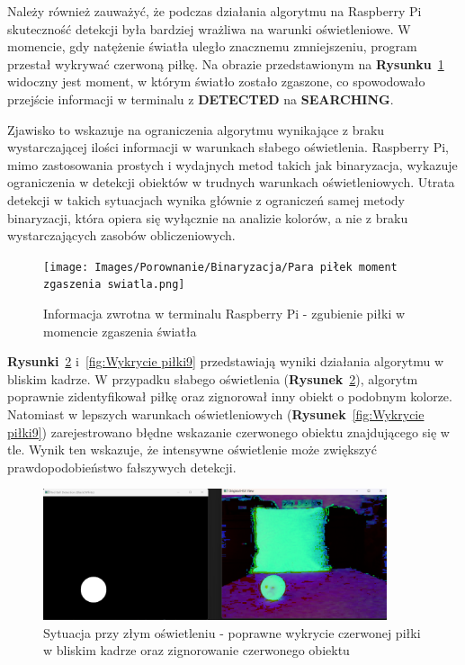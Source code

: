 \documentclass[a4paper,twoside,12pt]{book}
\begin{document}
Należy również zauważyć, że podczas działania algorytmu na Raspberry Pi skuteczność detekcji była bardziej wrażliwa na warunki oświetleniowe. W momencie, gdy natężenie światła uległo znacznemu zmniejszeniu, program przestał wykrywać czerwoną piłkę. Na obrazie przedstawionym na \textbf{Rysunku}~\ref{fig:Wykrycie piłki Rasp} widoczny jest moment, w którym światło zostało zgaszone, co spowodowało przejście informacji w terminalu z \textbf{DETECTED} na \textbf{SEARCHING}.


Zjawisko to wskazuje na ograniczenia algorytmu wynikające z braku wystarczającej ilości informacji w warunkach słabego oświetlenia. Raspberry Pi, mimo zastosowania prostych i wydajnych metod takich jak binaryzacja, wykazuje ograniczenia w detekcji obiektów w trudnych warunkach oświetleniowych. Utrata detekcji w takich sytuacjach wynika głównie z ograniczeń samej metody binaryzacji, która opiera się wyłącznie na analizie kolorów, a nie z braku wystarczających zasobów obliczeniowych.
\begin{figure}[h]
    \centering
    \texttt{[image: Images/Porownanie/Binaryzacja/Para piłek moment zgaszenia swiatla.png]}
    \caption{Informacja zwrotna w  terminalu Raspberry Pi - zgubienie piłki w momencie zgaszenia światła}
    \label{fig:Wykrycie piłki Rasp}
\end{figure}


\newpage

\textbf{Rysunki}~\ref{fig:Wykrycie piłki8} i~\ref{fig:Wykrycie piłki9} przedstawiają wyniki działania algorytmu w bliskim kadrze. W przypadku słabego oświetlenia (\textbf{Rysunek}~\ref{fig:Wykrycie piłki8}), algorytm poprawnie zidentyfikował piłkę oraz zignorował inny obiekt o podobnym kolorze. Natomiast w lepszych warunkach oświetleniowych (\textbf{Rysunek}~\ref{fig:Wykrycie piłki9}) zarejestrowano błędne wskazanie czerwonego obiektu znajdującego się w tle. Wynik ten wskazuje, że intensywne oświetlenie może zwiększyć prawdopodobieństwo fałszywych detekcji.

\begin{figure}[h]
    \centering
    \includegraphics[width=0.9\textwidth]{Images/Porownanie/Binaryzacja/Zrzut ekranu 2025-01-02 193840.png}
    \caption{Sytuacja przy złym oświetleniu - poprawne wykrycie czerwonej piłki w bliskim kadrze oraz zignorowanie czerwonego obiektu}
    \label{fig:Wykrycie piłki8}
\end{figure}
\end{document}
